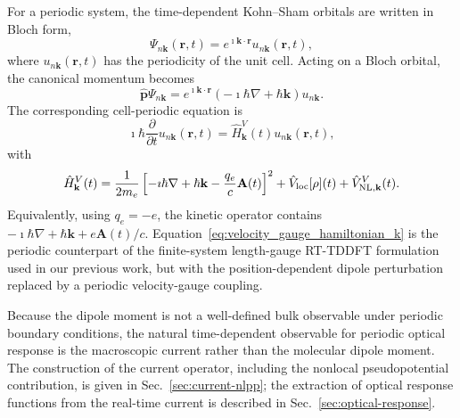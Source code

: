 For a periodic system, the time-dependent Kohn--Sham orbitals are
written in Bloch form,
\begin{equation}
  \Psi_{n\mathbf k}(\mathbf r,t)
  =
  e^{\imath\mathbf k\cdot\mathbf r}
  u_{n\mathbf k}(\mathbf r,t),
  \label{eq:bloch_orbital_td}
\end{equation}
where $u_{n\mathbf k}(\mathbf r,t)$ has the periodicity of the unit
cell.  Acting on a Bloch orbital, the canonical momentum becomes
\begin{equation}
  \hat{\mathbf p}\Psi_{n\mathbf k}
  =
  e^{\imath\mathbf k\cdot\mathbf r}
  \left(
    -\imath\hbar\nabla+\hbar\mathbf k
  \right)
  u_{n\mathbf k}.
  \label{eq:bloch_momentum_operator}
\end{equation}
The corresponding cell-periodic equation is
\begin{equation}
  \imath\hbar\frac{\partial}{\partial t}
  u_{n\mathbf k}(\mathbf r,t)
  =
  \hat H_{\mathbf k}^{V}(t)
  u_{n\mathbf k}(\mathbf r,t),
  \label{eq:tdks_cell_periodic}
\end{equation}
with
\begin{equation}
  \hat H_{\mathbf k}^{V}(t)
  =
  \frac{1}{2m_e}
  \left[
    -\imath\hbar\nabla
    +\hbar\mathbf k
    -
    \frac{q_e}{c}\mathbf A(t)
  \right]^2
  + \hat V_{\rm loc}[\rho](t)
  + \hat V_{{\rm NL},\mathbf k}^{V}(t).
  \label{eq:velocity_gauge_hamiltonian_k}
\end{equation}
Equivalently, using $q_e=-e$, the kinetic operator contains
$-\imath\hbar\nabla+\hbar\mathbf k+e\mathbf A(t)/c$.
Equation~\eqref{eq:velocity_gauge_hamiltonian_k} is the periodic
counterpart of the finite-system length-gauge RT-TDDFT formulation used
in our previous work,\cite{jakowski-rmg-tddft-2025} but with the position-dependent
dipole perturbation replaced by a periodic velocity-gauge coupling.

Because the dipole moment is not a well-defined bulk observable under
periodic boundary conditions, the natural time-dependent observable for
periodic optical response is the macroscopic current rather than the
molecular dipole moment.  The construction of the current operator,
including the nonlocal pseudopotential contribution, is given in
Sec.~\ref{sec:current-nlpp}; the extraction of optical response functions
from the real-time current is described in Sec.~\ref{sec:optical-response}.
